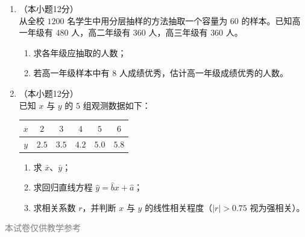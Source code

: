 \documentclass[12pt, a4paper]{ctexart}
\begin{document}
\begin{enumerate}[resume]
\vspace{6cm}

\item[21.]（本小题12分）\\
从全校 $1200$ 名学生中用分层抽样的方法抽取一个容量为 $60$ 的样本。已知高一年级有 $480$ 人，高二年级有 $360$ 人，高三年级有 $360$ 人。
\begin{enumerate}[(1)]
  \item 求各年级应抽取的人数；
  \item 若高一年级样本中有 $8$ 人成绩优秀，估计高一年级成绩优秀的人数。
\end{enumerate}

\vspace{6cm}

\item[22.]（本小题12分）\\
已知 $x$ 与 $y$ 的 $5$ 组观测数据如下：
\begin{center}
\begin{tabular}{|c|c|c|c|c|c|}
\hline
$x$ & $2$ & $3$ & $4$ & $5$ & $6$ \\ \hline
$y$ & $2.5$ & $3.5$ & $4.2$ & $5.0$ & $5.8$ \\ \hline
\end{tabular}
\end{center}
\begin{enumerate}[(1)]
  \item 求 $\bar{x}$、$\bar{y}$；
  \item 求回归直线方程 $\hat{y}=\hat{b}x+\hat{a}$；
  \item 求相关系数 $r$，并判断 $x$ 与 $y$ 的线性相关程度（$|r|>0.75$ 视为强相关）。
\end{enumerate}

\vspace{6cm}
\end{enumerate}

\vfill
\begin{center}
\small\textcolor{gray}{本试卷仅供教学参考}
\end{center}
\end{document}
